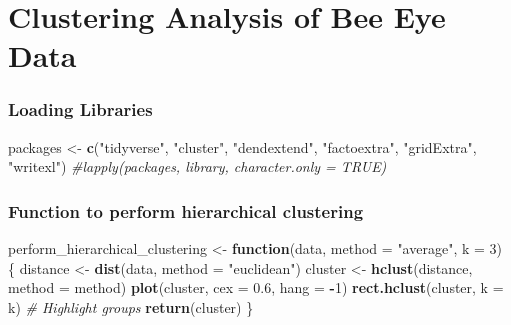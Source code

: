 \documentclass[
]{article}
\author{}
\date{\vspace{-2.5em}}
\newenvironment{Shaded}{\begin{snugshade}}{\end{snugshade}}
\newcommand{\AttributeTok}[1]{\textcolor[rgb]{0.13,0.29,0.53}{#1}}
\newcommand{\CommentTok}[1]{\textcolor[rgb]{0.56,0.35,0.01}{\textit{#1}}}
\newcommand{\ControlFlowTok}[1]{\textcolor[rgb]{0.13,0.29,0.53}{\textbf{#1}}}
\newcommand{\DecValTok}[1]{\textcolor[rgb]{0.00,0.00,0.81}{#1}}
\newcommand{\FloatTok}[1]{\textcolor[rgb]{0.00,0.00,0.81}{#1}}
\newcommand{\FunctionTok}[1]{\textcolor[rgb]{0.13,0.29,0.53}{\textbf{#1}}}
\newcommand{\NormalTok}[1]{#1}
\newcommand{\OtherTok}[1]{\textcolor[rgb]{0.56,0.35,0.01}{#1}}
\newcommand{\SpecialCharTok}[1]{\textcolor[rgb]{0.81,0.36,0.00}{\textbf{#1}}}
\newcommand{\StringTok}[1]{\textcolor[rgb]{0.31,0.60,0.02}{#1}}
\begin{document}
\section{Clustering Analysis of Bee Eye
Data}\label{clustering-analysis-of-bee-eye-data}

\subsubsection{Loading Libraries}\label{loading-libraries}

\begin{Shaded}
\begin{Highlighting}[]
\NormalTok{packages }\OtherTok{\textless{}{-}} \FunctionTok{c}\NormalTok{(}\StringTok{"tidyverse"}\NormalTok{, }\StringTok{"cluster"}\NormalTok{, }\StringTok{"dendextend"}\NormalTok{, }\StringTok{"factoextra"}\NormalTok{, }\StringTok{"gridExtra"}\NormalTok{, }\StringTok{"writexl"}\NormalTok{)}
\CommentTok{\#lapply(packages, library, character.only = TRUE)}
\end{Highlighting}
\end{Shaded}

\subsubsection{Function to perform hierarchical
clustering}\label{function-to-perform-hierarchical-clustering}

\begin{Shaded}
\begin{Highlighting}[]
\NormalTok{perform\_hierarchical\_clustering }\OtherTok{\textless{}{-}} \ControlFlowTok{function}\NormalTok{(data, }\AttributeTok{method =} \StringTok{"average"}\NormalTok{, }\AttributeTok{k =} \DecValTok{3}\NormalTok{) \{}
\NormalTok{  distance }\OtherTok{\textless{}{-}} \FunctionTok{dist}\NormalTok{(data, }\AttributeTok{method =} \StringTok{"euclidean"}\NormalTok{)}
\NormalTok{  cluster }\OtherTok{\textless{}{-}} \FunctionTok{hclust}\NormalTok{(distance, }\AttributeTok{method =}\NormalTok{ method)}
  \FunctionTok{plot}\NormalTok{(cluster, }\AttributeTok{cex =} \FloatTok{0.6}\NormalTok{, }\AttributeTok{hang =} \SpecialCharTok{{-}}\DecValTok{1}\NormalTok{)}
  \FunctionTok{rect.hclust}\NormalTok{(cluster, }\AttributeTok{k =}\NormalTok{ k)  }\CommentTok{\# Highlight groups}
  \FunctionTok{return}\NormalTok{(cluster)}
\NormalTok{\}}
\end{Highlighting}
\end{Shaded}
\end{document}

